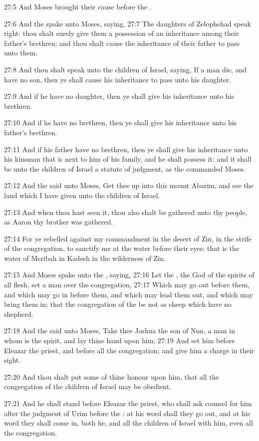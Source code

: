 27:5 And Moses brought their cause before the \LORD.

27:6 And the \LORD spake unto Moses, saying, 27:7 The daughters of
Zelophehad speak right: thou shalt surely give them a possession of an
inheritance among their father's brethren; and thou shalt cause the
inheritance of their father to pass unto them.

27:8 And thou shalt speak unto the children of Israel, saying, If a
man die, and have no son, then ye shall cause his inheritance to pass
unto his daughter.

27:9 And if he have no daughter, then ye shall give his inheritance
unto his brethren.

27:10 And if he have no brethren, then ye shall give his inheritance
unto his father's brethren.

27:11 And if his father have no brethren, then ye shall give his
inheritance unto his kinsman that is next to him of his family, and he
shall possess it: and it shall be unto the children of Israel a
statute of judgment, as the \LORD commanded Moses.

27:12 And the \LORD said unto Moses, Get thee up into this mount
Abarim, and see the land which I have given unto the children of
Israel.

27:13 And when thou hast seen it, thou also shalt be gathered unto thy
people, as Aaron thy brother was gathered.

27:14 For ye rebelled against my commandment in the desert of Zin, in
the strife of the congregation, to sanctify me at the water before
their eyes: that is the water of Meribah in Kadesh in the wilderness
of Zin.

27:15 And Moses spake unto the \LORD, saying, 27:16 Let the \LORD, the
God of the spirits of all flesh, set a man over the congregation,
27:17 Which may go out before them, and which may go in before them,
and which may lead them out, and which may bring them in; that the
congregation of the \LORD be not as sheep which have no shepherd.

27:18 And the \LORD said unto Moses, Take thee Joshua the son of Nun, a
man in whom is the spirit, and lay thine hand upon him; 27:19 And set
him before Eleazar the priest, and before all the congregation; and
give him a charge in their sight.

27:20 And thou shalt put some of thine honour upon him, that all the
congregation of the children of Israel may be obedient.

27:21 And he shall stand before Eleazar the priest, who shall ask
counsel for him after the judgment of Urim before the \LORD: at his
word shall they go out, and at his word they shall come in, both he,
and all the children of Israel with him, even all the congregation.

